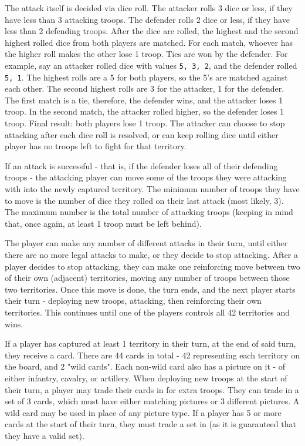 The attack itself is decided via dice roll. The attacker rolls 3 dice or less, if they have less than 3 attacking troops. The defender rolls 2 dice or less, if they have less than 2 defending troops. After the dice are rolled, the highest and the second highest rolled dice from both players are matched. For each match, whoever has the higher roll makes the other lose 1 troop. Ties are won by the defender. For example, say an attacker rolled dice with values \texttt{5, 3, 2}, and the defender rolled \texttt{5, 1}. The highest rolls are a 5 for both players, so the 5's are matched against each other. The second highest rolls are 3 for the attacker, 1 for the defender. The first match is a tie, therefore, the defender wins, and the attacker loses 1 troop. In the second match, the attacker rolled higher, so the defender loses 1 troop. Final result: both players lose 1 troop. The attacker can choose to stop attacking after each dice roll is resolved, or can keep rolling dice until either player has no troops left to fight for that territory.

If an attack is successful - that is, if the defender loses all of their defending troops - the attacking player can move some of the troops they were attacking with into the newly captured territory. The minimum number of troops they have to move is the number of dice they rolled on their last attack (most likely, 3). The maximum number is the total number of attacking troops (keeping in mind that, once again, at least 1 troop must be left behind). 

The player can make any number of different attacks in their turn, until either there are no more legal attacks to make, or they decide to stop attacking. After a player decides to stop attacking, they can make one reinforcing move between two of their own (adjacent) territories, moving any number of troops between those two territories. Once this move is done, the turn ends, and the next player starts their turn - deploying new troops, attacking, then reinforcing their own territories. This continues until one of the players controls all 42 territories and wins.

If a player has captured at least 1 territory in their turn, at the end of said turn, they receive a card. There are 44 cards in total - 42 representing each territory on the board, and 2 "wild cards". Each non-wild card also has a picture on it - of either infantry, cavalry, or artillery. When deploying new troops at the start of their turn, a player may trade their cards in for extra troops. They can trade in a set of 3 cards, which must have either matching pictures or 3 different pictures. A wild card may be used in place of any picture type. If a player has 5 or more cards at the start of their turn, they must trade a set in (as it is guaranteed that they have a valid set).

